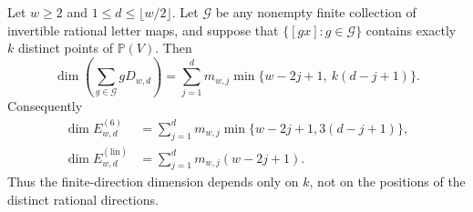 \begin{theorem}
\label{gorbit:thm:finite}
Let $w\ge2$ and $1\le d\le\lfloor w/2\rfloor$. Let
$\mathcal G$ be any nonempty finite collection of invertible rational
letter maps, and suppose that $\{[gx]:g\in\mathcal G\}$ contains
exactly $k$ distinct points of $\mathbb P(V)$. Then
\begin{equation}\label{gorbit:eq:finite}
 \boxed{\quad
 \dim\left(\sum_{g\in\mathcal G}gD_{w,d}\right)
 =\sum_{j=1}^{d}m_{w,j}
       \min\{w-2j+1,\ k(d-j+1)\}.
 \quad}
\end{equation}
Consequently
\begin{align}
 \dim E^{(6)}_{w,d}
   &=\sum_{j=1}^{d}m_{w,j}
          \min\{w-2j+1,3(d-j+1)\},\label{gorbit:eq:six}\\
 \dim E^{(\mathrm{lin})}_{w,d}
   &=\sum_{j=1}^{d}m_{w,j}(w-2j+1).
          \label{gorbit:eq:linear}
\end{align}
Thus the finite-direction dimension depends only on $k$, not on the
positions of the distinct rational directions.
\end{theorem}


